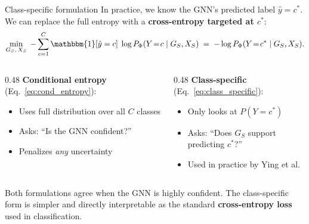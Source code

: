 \documentclass[xcolor=svgnames,aspectratio=169]{beamer}
\begin{document}
\begin{frame}{Class-specific formulation}
    In practice, we know the GNN's predicted label $\hat{y} = c^*$.  We can replace the full entropy with a \textbf{cross-entropy targeted at $c^*$}:
    \begin{equation}
        \label{eq:class_specific}
        \min_{G_S,\, X_S} \; -\sum_{c=1}^{C} \mathbbm{1}[\hat{y} = c]\;\log P_\Phi(Y\!=\!c \mid G_S, X_S) \;=\; -\log P_\Phi(Y\!=\!c^* \mid G_S, X_S).
    \end{equation}

    \begin{columns}[T]
    \begin{column}{0.48\textwidth}
        \textbf{Conditional entropy} (Eq.~\ref{eq:cond_entropy}):
        \begin{itemize}
            \item Uses full distribution over all $C$ classes
            \item Asks: ``Is the GNN confident?''
            \item Penalizes \emph{any} uncertainty
        \end{itemize}
    \end{column}
    \begin{column}{0.48\textwidth}
        \textbf{Class-specific} (Eq.~\ref{eq:class_specific}):
        \begin{itemize}
            \item Only looks at $P(Y\!=\!c^*)$
            \item Asks: ``Does $G_S$ support predicting $c^*$?''
            \item Used in practice by Ying et al.
        \end{itemize}
    \end{column}
    \end{columns}
    \vspace{6pt}
    Both formulations agree when the GNN is highly confident.  The class-specific form is simpler and directly interpretable as the standard \textbf{cross-entropy loss} used in classification.
\end{frame}
\end{document}
